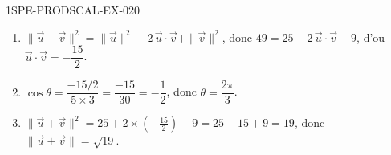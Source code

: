 \begin{corrige}{1SPE-PRODSCAL-EX-020}
\begin{enumerate}
\item $\|\vec{u} - \vec{v}\|^2 = \|\vec{u}\|^2 - 2\,\vec{u} \cdot \vec{v} + \|\vec{v}\|^2$, donc $49 = 25 - 2\,\vec{u} \cdot \vec{v} + 9$, d'ou $\vec{u} \cdot \vec{v} = -\dfrac{15}{2}$.
\item $\cos\theta = \dfrac{-15/2}{5 \times 3} = \dfrac{-15}{30} = -\dfrac{1}{2}$, donc $\theta = \dfrac{2\pi}{3}$.
\item $\|\vec{u} + \vec{v}\|^2 = 25 + 2 \times (-\frac{15}{2}) + 9 = 25 - 15 + 9 = 19$, donc $\|\vec{u} + \vec{v}\| = \sqrt{19}$.
\end{enumerate}
\end{corrige}
